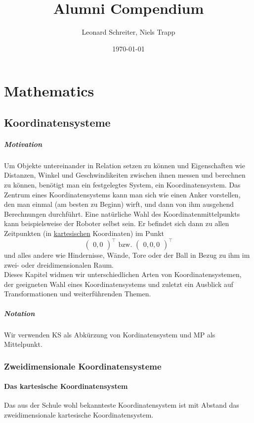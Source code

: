 \documentclass[12pt,a4paper]{report}
\title{Alumni Compendium}           %
\author{Leonard Schreiter, Niels Trapp}          %
\date{\today}           %
\begin{document}
	\maketitle

	\tableofcontents

	\chapter{Mathematics}
	 \section{Koordinatensysteme}
	  \paragraph{Motivation}

		  Um Objekte untereinander in Relation setzen zu können und Eigenschaften wie Distanzen, Winkel und Geschwindikeiten zwischen ihnen messen und berechnen zu können, benötigt man ein festgelegtes System, ein Koordinatensystem.
		  Das Zentrum eines Koordinatensystems kann man sich wie einen Anker vorstellen, den man einmal (am besten zu Beginn) wirft, und dann von ihm ausgehend Berechnungen durchführt.
		  Eine natürliche Wahl des Koordinatenmittelpunkts kann beispielsweise der Roboter selbst sein. Er befindet sich dann zu allen Zeitpunkten (in \hyperref[Mathe_KS_kartesisch]{kartesischen} Koordinaten) im Punkt
		  \[ \begin{pmatrix}0,0\end{pmatrix}^\top \text{ bzw. }\begin{pmatrix}0,0,0\end{pmatrix}^\top \]
		  und alles andere wie Hindernisse, Wände, Tore oder der Ball in Bezug zu ihm im zwei- oder dreidimensionalen Raum. \\
		  Dieses Kapitel widmen wir unterschiedlichen Arten von Koordinatensystemen, der geeigneten Wahl eines Koordinatensystems und zuletzt ein Ausblick auf Transformationen und weiterführenden Themen.

	  \paragraph{Notation}
		  Wir verwenden KS als Abkürzung von Kordinatensystem und MP als Mittelpunkt.

	  \subsection{Zweidimensionale Koordinatensysteme}
		  \subsubsection{Das kartesische Koordinatensystem}\label{Mathe_KS_kartesisch}
			  Das aus der Schule wohl bekannteste Koordinatensystem ist mit Abstand das zweidimensionale kartesische Koordinatensystem.
\end{document}
